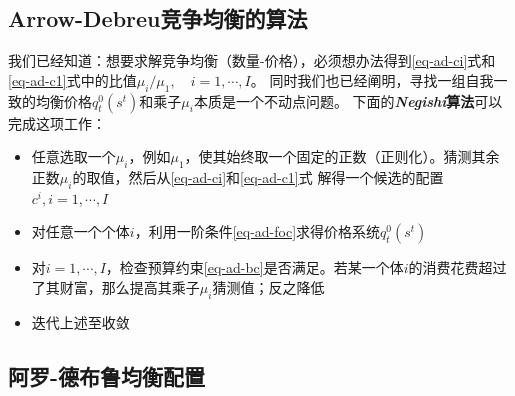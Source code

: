 \subsection{Arrow-Debreu竞争均衡的算法}  \label{subsec-ad-compute}

我们已经知道：想要求解竞争均衡（数量-价格），必须想办法得到\ref{eq-ad-ci}式和\ref{eq-ad-c1}式中的比值$\mu_i/\mu_1, \quad i=1,\cdots,I$。
同时我们也已经阐明，寻找一组自我一致的均衡价格$q_t^0\left(s^t\right)$和乘子$\mu_i$本质是一个不动点问题。
下面的\textbf{\textit{Negishi}算法}可以完成这项工作：
\begin{itemize}
    \item 任意选取一个$\mu_i$，例如$\mu_1$，使其始终取一个固定的正数（正则化）。猜测其余正数$\mu_i$的取值，然后从\ref{eq-ad-ci}和\ref{eq-ad-c1}式
        解得一个候选的配置$c^i, i=1,\cdots,I$
    \item 对任意一个个体$i$，利用一阶条件\ref{eq-ad-foc}求得价格系统$q_t^0\left(s^t\right)$
    \item 对$i=1,\cdots,I$，检查预算约束\ref{eq-ad-bc}是否满足。若某一个体$i$的消费花费超过了其财富，那么提高其乘子$\mu_i$猜测值；反之降低
    \item 迭代上述至收敛
\end{itemize}


\subsection{阿罗-德布鲁均衡配置}

